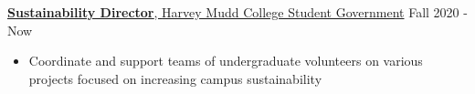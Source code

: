 \documentclass[11pt]{article}
\newcommand{\hdr}[1]{\textcolor{blue(ryb)}{\textbf{#1}}}
\newcommand{\role}[3]{\underline{\textbf{#1}, {#2}} \hfill #3}
\begin{document}
\smallskip
\role{Sustainability Director}{Harvey Mudd College Student Government}{Fall 2020 - Now}
\begin{itemize}
\item Coordinate and support teams of undergraduate volunteers on various projects focused on increasing campus sustainability
\end{itemize}
\end{document}
